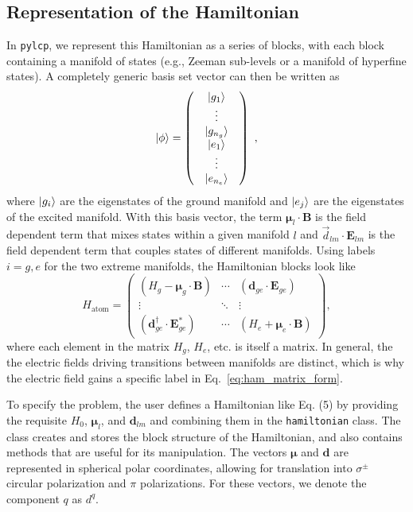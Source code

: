 \documentclass[final,5p,times,twocolumn]{elsarticle}
\begin{document}
\subsection{Representation of the Hamiltonian}
In {\tt pylcp}, we represent this Hamiltonian as a series of blocks, with each block containing a manifold of states (e.g., Zeeman sub-levels or a manifold of hyperfine states). A completely generic basis set vector can then be written as
\begin{equation}
    \ket{\phi} = \left(\begin{array}{c} \begin{array}{c} \ket{g_1} \\ \vdots \\ \ket{g_{n_g}} \end{array} \\ \begin{array}{c} \ket{e_1} \\ \vdots \\ \ket{e_{n_e}} \end{array} \end{array}\right)\ ,
\end{equation}
where $\ket{g_i}$ are the eigenstates of the ground manifold and $\ket{e_j}$ are
the eigenstates of the excited manifold.  With this basis vector, the term $\boldsymbol{\mu}_l\cdot\mathbf{B}$ is the field dependent term that mixes states within a given manifold $l$ and $\vec{d}_{lm}\cdot\mathbf{E}_{lm}$ is the field dependent term that couples states of different manifolds.  Using labels $i=g,e$ for the two extreme manifolds, the Hamiltonian blocks look like
\begin{equation}
    \label{eq:ham_matrix_form}
    H_\text{atom} = \left(
    \begin{array}{ccc}
    (H_g - \boldsymbol{\mu}_g\cdot \mathbf{B}) & \cdots & (\boldsymbol{d}_{ge}\cdot\mathbf{E}_{ge}) \\
    \vdots & \ddots & \vdots  \\
    (\boldsymbol{d}_{ge}^\dagger\cdot\mathbf{E}_{ge}^*) & \cdots & (H_e+\boldsymbol{\mu}_e\cdot \mathbf{B})
    \end{array}\right),
\end{equation}
where each element in the matrix $H_g$, $H_e$, etc. is itself a matrix.  In general, the the electric fields driving transitions between manifolds are distinct, which is why the electric field gains a specific label in Eq.~\ref{eq:ham_matrix_form}.

To specify the problem, the user defines a Hamiltonian like Eq. (5) by providing the requisite $H_0$, $\boldsymbol{\mu}_l$, and $\boldsymbol{d}_{lm}$ and combining them in the {\tt hamiltonian} class.  The class creates and stores the block structure of the Hamiltonian, and also contains methods that are useful for its manipulation.  The vectors $\boldsymbol{\mu}$ and $\boldsymbol{d}$ are represented in spherical polar coordinates, allowing for translation into $\sigma^{\pm}$ circular polarization and $\pi$ polarizations.  For these vectors, we denote the component $q$ as $d^q$.
\end{document}
